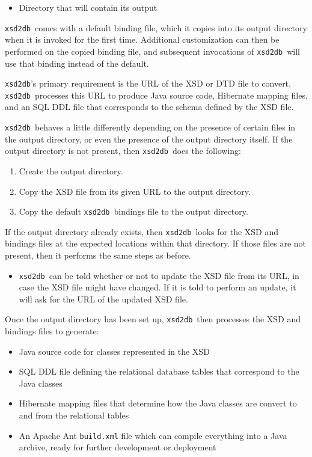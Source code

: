 \documentclass[10pt]{bmc_article}
\newenvironment{bmcformat}{\begin{raggedright}\baselineskip20pt\sloppy\setboolean{publ}{false}}{\end{raggedright}\baselineskip20pt\sloppy}
\def\xsd2db{\texttt{xsd2db}}
\begin{document}
\begin{bmcformat}
\begin{itemize}
\item Directory that will contain its output
\end{itemize}
\xsd2db\ comes with a default binding file, which it copies into its output directory when it is invoked for the first time.  Additional customization can then be performed on the copied binding file, and subsequent invocations of \xsd2db\ will use that binding instead of the default.\pb

\xsd2db's primary requirement is the URL of the XSD or DTD file to convert.  \xsd2db\  processes this URL to produce Java source code, Hibernate mapping files, and an SQL DDL file that corresponds to the schema defined by the XSD file.\pb

\xsd2db\ behaves a little differently depending on the presence of certain files in the output directory, or even the presence of the output directory itself.  If the output directory is not present, then \xsd2db\ does the following:
\begin{enumerate}
\item Create the output directory.
\item Copy the XSD file from its given URL to the output directory.
\item Copy the default \xsd2db\ bindings file to the output directory.
\end{enumerate}
If the output directory already exists, then \xsd2db\ looks for the XSD and bindings files at the expected locations within that directory.  If those files are not present, then it performs the same steps as before.
\begin{itemize}
\item \xsd2db\ can be told whether or not to update the XSD file from its URL, in case the XSD file might have changed.  If it is told to perform an update, it will ask for the URL of the updated XSD file.
\end{itemize}
Once the output directory has been set up, \xsd2db\ then processes the XSD and bindings files to generate:
\begin{itemize}
\item Java source code for classes represented in the XSD
\item SQL DDL file defining the relational database tables that correspond to the Java classes
\item Hibernate mapping files that determine how the Java classes are convert to and from the relational tables
\item An Apache Ant \texttt{build.xml} file which can compile everything into a Java archive, ready for further development or deployment

\end{itemize}
\end{bmcformat}
\end{document}

